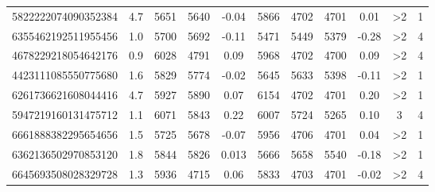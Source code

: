 \begin{table}
\begin{tabular}{ccccccccccc}
		5822222074090352384 & 4.7 & 5651 & 5640 & -0.04 & 5866 & 4702 & 4701 & 0.01 & >2 & 1 \\
		6355462192511955456 & 1.0 & 5700 & 5692 & -0.11 & 5471 & 5449 & 5379 & -0.28 & >2 & 4 \\
		4678229218054642176 & 0.9 & 6028 & 4791 & 0.09 & 5968 & 4702 & 4700 & 0.09 & >2 & 4 \\
		4423111085550775680 & 1.6 & 5829 & 5774 & -0.02 & 5645 & 5633 & 5398 & -0.11 & >2 & 1 \\
		6261736621608044416 & 4.7 & 5927 & 5890 & 0.07 & 6154 & 4702 & 4701 & 0.20 & >2 & 1 \\
		5947219160131475712 & 1.1 & 6071 & 5843 & 0.22 & 6007 & 5724 & 5265 & 0.10 & 3 & 4 \\
		6661888382295654656 & 1.5 & 5725 & 5678 & -0.07 & 5956 & 4706 & 4701 & 0.04 & >2 & 1 \\
		6362136502970853120 & 1.8 & 5844 & 5826 & 0.013 & 5666 & 5658 & 5540 & -0.18 & >2 & 1 \\
		6645693508028329728 & 1.3 & 5936 & 4715 & 0.06 & 5833 & 4703 & 4701 & -0.02 & >2 & 4 \\
		\hline
	\end{tabular}
\end{table}




